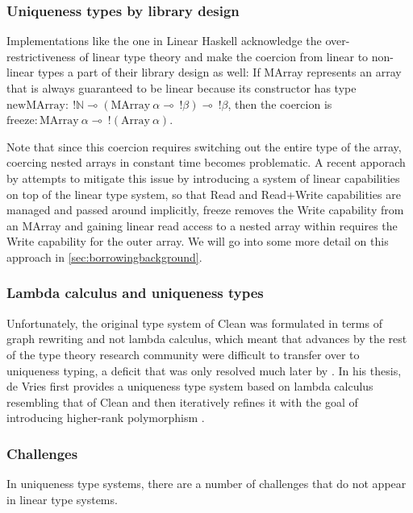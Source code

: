 \subsubsection{Uniqueness types by library design}
Implementations like the one in Linear Haskell \citep{bernardy_linear_2018} acknowledge the over-restrictiveness of linear type theory and make the coercion from linear to non-linear types a part of their library design as well: If MArray represents an array that is always guaranteed to be linear because its constructor has type $\mathrm{newMArray} :\ !\mathbb{N} \multimap (\mathrm{MArray}\ \alpha \multimap\ !\beta) \multimap\ !\beta$, then the coercion is $\mathrm{freeze} : \mathrm{MArray}\ \alpha \multimap\ !(\mathrm{Array}\ \alpha)$. 

Note that since this coercion requires switching out the entire type of the array, coercing nested arrays in constant time becomes problematic. A recent apporach by \cite{spiwack_linearly_2022} attempts to mitigate this issue by introducing a system of linear capabilities on top of the linear type system, so that Read and Read+Write capabilities are managed and passed around implicitly, freeze removes the Write capability from an MArray and gaining linear read access to a nested array within requires the Write capability for the outer array. We will go into some more detail on this approach in \cref{sec:borrowingbackground}.

\subsubsection{Lambda calculus and uniqueness types}
Unfortunately, the original type system of Clean was formulated in terms of graph rewriting and not lambda calculus, which meant that advances by the rest of the type theory research community were difficult to transfer over to uniqueness typing, a deficit that was only resolved much later by \cite{de_vries_making_2009}. In his thesis, de Vries first provides a uniqueness type system based on lambda calculus resembling that of Clean and then iteratively refines it with the goal of introducing higher-rank polymorphism \citep{peyton_jones_practical_2007}.

\subsubsection{Challenges}
In uniqueness type systems, there are a number of challenges that do not appear in linear type systems. 

